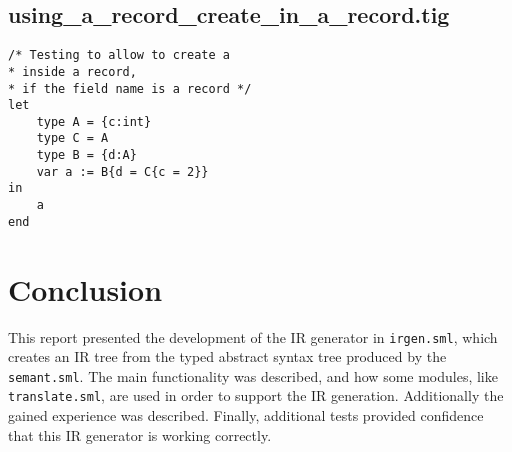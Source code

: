 \documentclass{article}
\begin{document}
\subsection{using\_a\_record\_create\_in\_a\_record.tig}

\begin{lstlisting}[frame=single]
/* Testing to allow to create a
* inside a record,
* if the field name is a record */
let
	type A = {c:int}
	type C = A
	type B = {d:A}
	var a := B{d = C{c = 2}}
in
	a
end
\end{lstlisting}


\section{Conclusion}
This report presented the development of the IR generator in \texttt{irgen.sml}, which creates an IR tree from the typed abstract syntax tree produced by the \texttt{semant.sml}. The main functionality was described, and how some modules, like \texttt{translate.sml}, are used in order to support the IR generation. Additionally the gained experience was described. Finally, additional tests provided confidence that this IR generator is working correctly.
\end{document}
